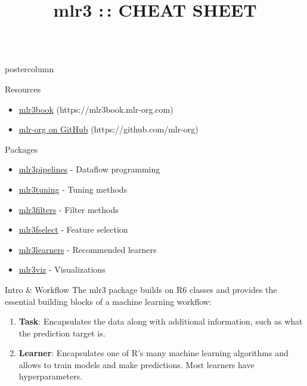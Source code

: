 \documentclass{beamer}
\title{mlr3 :\,: CHEAT SHEET} %
\newlength{\columnheight} %
\begin{document}
\begin{frame}[fragile]{}
	\begin{columns}
		\begin{column}{.245\textwidth}
			\begin{beamercolorbox}[center]{postercolumn}
				\begin{minipage}{.98\textwidth}
					\parbox[t][\columnheight]{\textwidth}{
						\begin{myblock}{Resources}
							\begin{itemize}
								\item \href{https://mlr3book.mlr-org.com/index.html}{mlr3book} (https://mlr3book.mlr-org.com)
								\item \href{https://github.com/mlr-org}{mlr-org on GitHub} (https://github.com/mlr-org)
							\end{itemize}
						\end{myblock}
						\begin{myblock}{Packages}
							\vfill
							\begin{itemize}
								\item \href{https://github.com/mlr-org/mlr3pipelines}{mlr3pipelines} - Dataflow programming
								\item \href{https://github.com/mlr-org/mlr3tuning}{mlr3tuning} - Tuning methods
								\item \href{https://github.com/mlr-org/mlr3filters}{mlr3filters} - Filter methods
								\item \href{https://github.com/mlr-org/mlr3fselect}{mlr3fselect} - Feature selection
								\item \href{https://github.com/mlr-org/mlr3learners}{mlr3learners} - Recommended learners
								\item \href{https://github.com/mlr-org/mlr3viz}{mlr3viz} - Visualizations
							\end{itemize}
						\end{myblock}
						\begin{myblock}{Intro \& Workflow}
							The mlr3 package builds on R6 classes and provides the essential building
							blocks of a machine learning workflow:
							\begin{enumerate}
								\item \textbf{Task}: Encapsulates the data along with additional information, such as what the prediction target is.
								\item \textbf{Learner}: Encapsulates one of R's many machine learning algorithms and allows to train models and make predictions. Most learners have hyperparameters.

\end{enumerate}
\end{myblock}}
\end{minipage}
\end{beamercolorbox}
\end{column}
\end{columns}
\end{frame}
\end{document}
